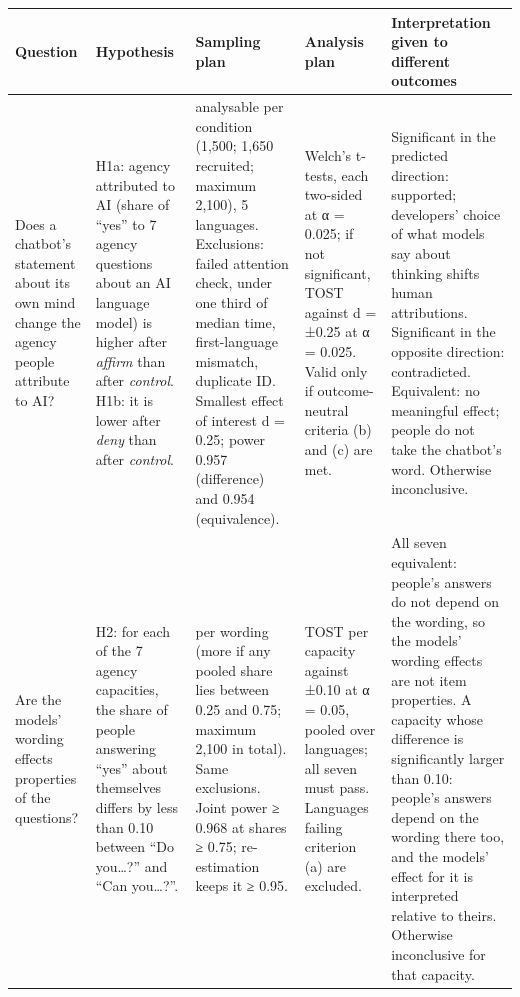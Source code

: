 \documentclass[
  11pt,
]{article}
\begin{document}
\begin{longtable}[]{@{}
  >{\raggedright\arraybackslash}p{}
  >{\raggedright\arraybackslash}p{}
  >{\raggedright\arraybackslash}p{}
  >{\raggedright\arraybackslash}p{}
  >{\raggedright\arraybackslash}p{}@{}}
\toprule
Question & Hypothesis & Sampling plan & Analysis plan & Interpretation
given to different outcomes \\
\midrule
\endhead
Does a chatbot's statement about its own mind change the agency people
attribute to AI? & H1a: agency attributed to AI (share of ``yes'' to 7
agency questions about an AI language model) is higher after
\emph{affirm} than after \emph{control}. H1b: it is lower after
\emph{deny} than after \emph{control}. & 500 analysable per condition
(1,500; 1,650 recruited; maximum 2,100), 5 languages. Exclusions: failed
attention check, under one third of median time, first-language
mismatch, duplicate ID. Smallest effect of interest d = 0.25; power
0.957 (difference) and 0.954 (equivalence). & Welch's t-tests, each
two-sided at α = 0.025; if not significant, TOST against d = ±0.25 at α
= 0.025. Valid only if outcome-neutral criteria (b) and (c) are met. &
Significant in the predicted direction: supported; developers' choice of
what models say about thinking shifts human attributions. Significant in
the opposite direction: contradicted. Equivalent: no meaningful effect;
people do not take the chatbot's word. Otherwise inconclusive. \\
Are the models' wording effects properties of the questions? & H2: for
each of the 7 agency capacities, the share of people answering ``yes''
about themselves differs by less than 0.10 between ``Do you\ldots?'' and
``Can you\ldots?''. & 750 per wording (more if any pooled share lies
between 0.25 and 0.75; maximum 2,100 in total). Same exclusions. Joint
power ≥ 0.968 at shares ≥ 0.75; re-estimation keeps it ≥ 0.95. & TOST
per capacity against ±0.10 at α = 0.05, pooled over languages; all seven
must pass. Languages failing criterion (a) are excluded. & All seven
equivalent: people's answers do not depend on the wording, so the
models' wording effects are not item properties. A capacity whose
difference is significantly larger than 0.10: people's answers depend on
the wording there too, and the models' effect for it is interpreted
relative to theirs. Otherwise inconclusive for that capacity. \\

\end{longtable}
\end{document}
